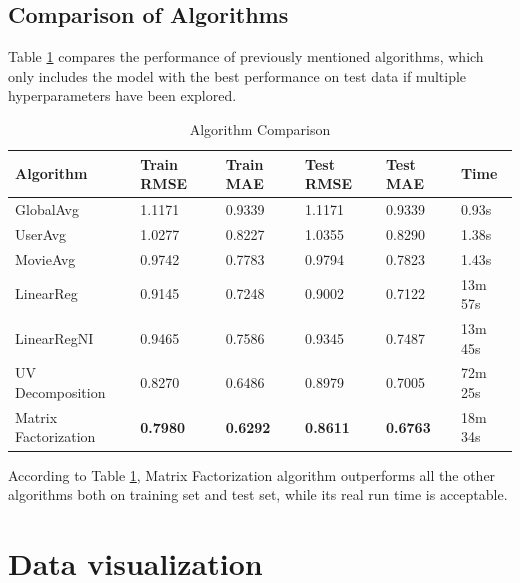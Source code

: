 \documentclass{article}
\begin{document}
\subsection{Comparison of Algorithms}
Table \ref{tab:1.4} compares the performance of previously mentioned algorithms, which only includes the model with the best performance on test data if multiple hyperparameters have been explored.
\begin{table}[ht]
    \centering
    \caption{Algorithm Comparison}
    \label{tab:1.4}
    \begin{tabular}{llllll}
        \toprule
        \textbf{Algorithm} & \textbf{Train RMSE} & \textbf{Train MAE} & \textbf{Test RMSE} & \textbf{Test MAE} & \textbf{Time}\\
        \midrule
        GlobalAvg & 1.1171 & 0.9339 & 1.1171 & 0.9339 & 0.93s\\
        UserAvg & 1.0277 & 0.8227 & 1.0355 & 0.8290 & 1.38s\\
        MovieAvg & 0.9742 & 0.7783 & 0.9794 & 0.7823 & 1.43s\\
        LinearReg & 0.9145 & 0.7248 & 0.9002 & 0.7122 & 13m 57s\\
        LinearRegNI & 0.9465 & 0.7586 & 0.9345 & 0.7487 & 13m 45s\\
        UV Decomposition & 0.8270 & 0.6486 & 0.8979 & 0.7005 & 72m 25s\\
        Matrix Factorization & \textbf{0.7980} & \textbf{0.6292} & \textbf{0.8611} & \textbf{0.6763} & 18m 34s\\
        \bottomrule
    \end{tabular}
\end{table}
\par
According to Table \ref{tab:1.4}, Matrix Factorization algorithm outperforms all the other algorithms both on training set and test set, while its real run time is acceptable.

\section{Data visualization}
\end{document}

